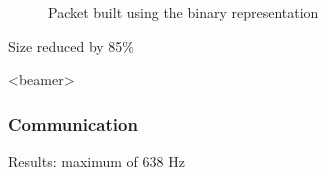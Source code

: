 \begin{frame}
\begin{figure}[h]
\begin{minipage}{.45\textwidth}
{\begin{tikzpicture}
  \end{tikzpicture}
  }
  \caption{Packet built using the binary representation}
  \label{fig:new_packets}
\end{minipage}
\end{figure}
\begin{center}
  Size reduced by 85\%
  \end{center}
\end{frame}


\begin{frame}<beamer>
\frametitle{Communication}
   Results: maximum of 638 Hz
\end{frame}





